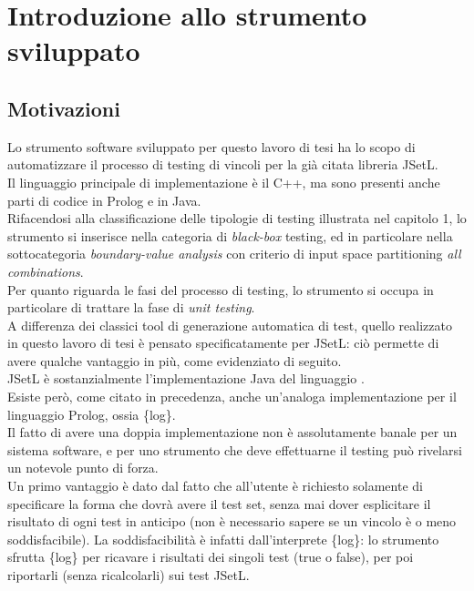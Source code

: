 \documentclass{article}
\begin{document}
\section{Introduzione allo strumento sviluppato}
\subsection{Motivazioni}
Lo strumento software sviluppato per questo lavoro di tesi ha lo scopo di automatizzare il processo di testing di vincoli per la già citata libreria JSetL. \\
Il linguaggio principale di implementazione è il C++, ma sono presenti anche parti di codice in Prolog e in Java. \\
Rifacendosi alla classificazione delle tipologie di testing illustrata nel capitolo 1, lo strumento si inserisce nella categoria di \emph{black-box} testing, ed in particolare nella sottocategoria \emph{boundary-value analysis} con criterio di input space partitioning \emph{all combinations}.\\
Per quanto riguarda le fasi del processo di testing, lo strumento si occupa in particolare di trattare la fase di \emph{unit testing}.\\
A differenza dei classici tool di generazione automatica di test, quello realizzato in questo lavoro di tesi è pensato specificatamente per JSetL: ciò permette di avere qualche vantaggio in più, come evidenziato di seguito.\\
JSetL è sostanzialmente l'implementazione Java del linguaggio .\\
Esiste però, come citato in precedenza, anche un'analoga implementazione per il linguaggio Prolog, ossia \{log\}.\\
Il fatto di avere una doppia implementazione non è assolutamente banale per un sistema software, e per uno strumento che deve effettuarne il testing può rivelarsi un notevole punto di forza.\\
Un primo vantaggio è dato dal fatto che all'utente è richiesto solamente di specificare la forma che dovrà avere il test set, senza mai dover esplicitare il risultato di ogni test in anticipo (non è necessario sapere se un vincolo è o meno soddisfacibile). La soddisfacibilità è infatti  dall'interprete \{log\}: lo strumento sfrutta \{log\} per ricavare i risultati dei singoli test (true o false), per poi riportarli (senza ricalcolarli) sui test JSetL.\\
\end{document}
